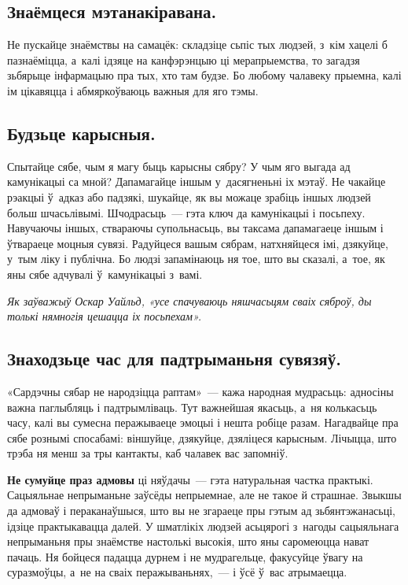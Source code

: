 \subsection*{Знаёмцеся мэтанакіравана.}

Не пускайце знаёмствы на самацёк: складзіце сьпіс тых людзей, з~кім хацелі б пазнаёміцца, а~калі ідзяце на канфэрэнцыю ці мерапрыемства, то загадзя зьбярыце інфармацыю пра тых, хто там будзе. Бо любому чалавеку прыемна, калі ім цікавяцца і абмяркоўваюць важныя для яго тэмы.

\subsection*{Будзьце карысныя.}

Спытайце сябе, чым я магу быць карысны сябру? У чым яго выгада ад камунікацыі са мной? Дапамагайце іншым у~дасягненьні іх мэтаў. Не чакайце рэакцыі ў~адказ або падзякі, шукайце, як вы можаце зрабіць іншых людзей больш шчасьлівымі. Шчодрасьць~--- гэта ключ да камунікацыі і посьпеху. Навучаючы іншых, ствараючы супольнасьць, вы таксама дапамагаеце іншым і ўтвараеце моцныя сувязі. Радуйцеся вашым сябрам, натхняйцеся імі, дзякуйце, у~тым ліку і публічна. Бо людзі запамінаюць ня тое, што вы сказалі, а~тое, як яны сябе адчувалі ў~камунікацыі з~вамі.

\emph{Як заўважыў Оскар Уайльд, «усе спачуваюць няшчасьцям сваіх сяброў, ды толькі нямногія цешацца іх посьпехам».}

\subsection*{Знаходзьце час для падтрыманьня сувязяў.}

«Сардэчны сябар не народзіцца раптам»~--- кажа народная мудрасьць: адносіны важна паглыбляць і падтрымліваць. Тут важнейшая якасьць, а~ня колькасьць часу, калі вы сумесна перажываеце эмоцыі і нешта робіце разам. Нагадвайце пра сябе рознымі спосабамі: віншуйце, дзякуйце, дзяліцеся карысным. Лічыцца, што трэба ня менш за тры кантакты, каб чалавек вас запомніў.

\textbf{Не сумуйце праз адмовы} ці няўдачы~--- гэта натуральная частка практыкі. Сацыяльнае непрыманьне заўсёды непрыемнае, але не такое й страшнае. Звыкшы да адмоваў і пераканаўшыся, што вы не згараеце пры гэтым ад зьбянтэжанасьці, ідзіце практыкавацца далей. У шматлікіх людзей асьцярогі з~нагоды сацыяльнага непрыманьня пры знаёмстве настолькі высокія, што яны саромеюцца нават пачаць. Ня бойцеся падацца дурнем і не мудрагельце, факусуйце ўвагу на суразмоўцы, а~не на сваіх перажываньнях,~--- і ўсё ў~вас атрымаецца.

